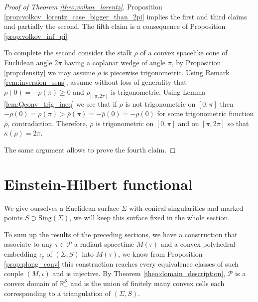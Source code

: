 \documentclass[a4paper,12pt]{article}
\def\TT{\mathcal T}
\def\adm{\P}
\def\sing{\mathrm{Sing}}
\def\RR{\mathbb{R}}
\def\sing{\mathrm{Sing}}
\def\adm{\mathcal{P}}
\def\sing{\mathrm{Sing}}
\def\P{\mathcal{P}}
\def\CellPSigma{\P_\TT}
\theoremstyle{definition}
\begin{document}
            \begin{proof}[Proof of Theorem \ref{theo:volkov_lorentz}]
             Proposition \ref{prop:volkov_lorentz_case_bigger_than_2pi} implies the first and third  claims and partially the second. The fifth claim is a consequence of Proposition \ref{prop:volkov_inf_pi}
             
             To complete the second
            consider the stalk $\rho$ of a convex spacelike cone of Euclidean angle $2\pi$ having a coplanar wedge of angle $\pi$, by  Proposition \ref{prop:density} we may assume $\rho$ is piecewise trigonometric.  
            Using Remark \ref{rem:inversion_sens}, assume without loss of generality  that $\rho(0) = -\rho(\pi)\geq0$ and $\rho_{|[\pi,2\pi]}$ is trigonometric. Using Lemma \ref{lem:Qconv_trig_ineq} we see that if $\rho$ is not trigonometric on $[0,\pi]$ then $-\rho(0)=\rho(\pi)>\overline \rho(\pi)=-\overline \rho(0)=-\rho(0)$ for some trigonometric function $\overline \rho$, contradiction. Therefore, $\rho$ is trigonometric on $[0,\pi]$ and on $[\pi,2\pi]$ so that $\kappa(\rho)=2\pi$.
            
            The same argument allows to prove the fourth claim. 
            \end{proof}

        



					
			\section{Einstein-Hilbert functional}
			\label{sec:functionnelle}
				\def\PsqTT{\CellPSigma^{1/2}}
				\def\Psq{\adm^{1/2}}
				We give ourselves a Euclidean surface $\Sigma$ with conical singularities and marked points $S\supset \sing(\Sigma)$, we will keep this surface fixed in the whole section.
				
				To sum up the results of the preceding sections, we have a construction that associate to any $\tau\in \adm$ a radiant spacetime $M(\tau)$ and a convex polyhedral embedding $\iota_\tau$ of $(\Sigma, S)$ into $M(\tau)$, we know from Proposition \ref{prop:plong_conv} this construction reaches every equivalence classes of such couple $(M,\iota)$ and is injective. By Theorem \ref{theo:domain_description}, $\adm$ is a convex domain of $\RR_+^S$ and is the union of finitely many convex cells each corresponding to a triangulation of $(\Sigma, S)$.
				
\end{document}
